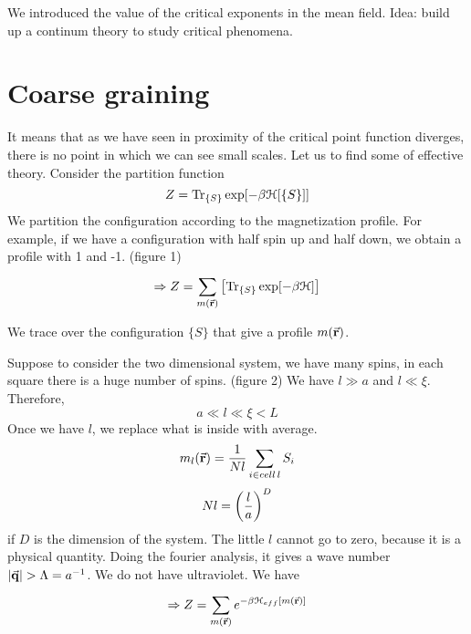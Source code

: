 \documentclass[../main/main.tex]{subfiles}
\begin{document}

We introduced the value of the critical exponents in the mean field.
Idea: build up a continum theory to study critical phenomena.
\section{Coarse graining}
It means  that as we have seen in proximity of the critical point function diverges, there is no point in which we can see small scales. Let us to find some of effective theory.
Consider the partition function
\begin{equation}
  Z = \Tr_{\{ S \}  } \exp [- \beta \mathcal{H} [ \{ S \}  ]]
\end{equation}
We partition the configuration according to the magnetization profile. For example, if we have a configuration with half spin up and half down, we obtain a profile with 1 and -1. (figure 1)
\begin{equation}
\Rightarrow Z = \sum_{m(\va{r})}^{}  \qty[\Tr_{\{ S \}  }  \exp [- \beta \mathcal{H} ]  ]
\end{equation}
\begin{remark}
We trace over the configuration \( \{ S \}   \)  that give a profile \( m(\va{r}) \).
\end{remark}
Suppose to consider the two dimensional system, we have many spins, in each square there is a huge number of spins. (figure 2) We have \( l \gg a \) and \( l \ll \xi  \). Therefore,
\begin{equation}
  a \ll l \ll \xi < L
\end{equation}
Once we have \( l \), we replace what is inside with average.
\begin{equation}
   m_l (\va{r}) = \frac{1}{Nl} \sum_{i \in cell \, l}^{} S_i
\end{equation}
\begin{equation}
  Nl = \qty(\frac{l}{a})^D
\end{equation}
if \( D \) is the dimension of the system.
The little \( l \) cannot go to zero, because it is a physical quantity. Doing the fourier analysis, it gives a wave number \( \abs{\va{q}} > \Lambda = a^{-1} \). We do not have ultraviolet.
We have
\begin{equation}
  \Rightarrow Z = \sum_{m(\va{r})}^{} e^{-\beta \mathcal{H}_{eff} [m(\va{r})]}
\end{equation}
\end{document}
